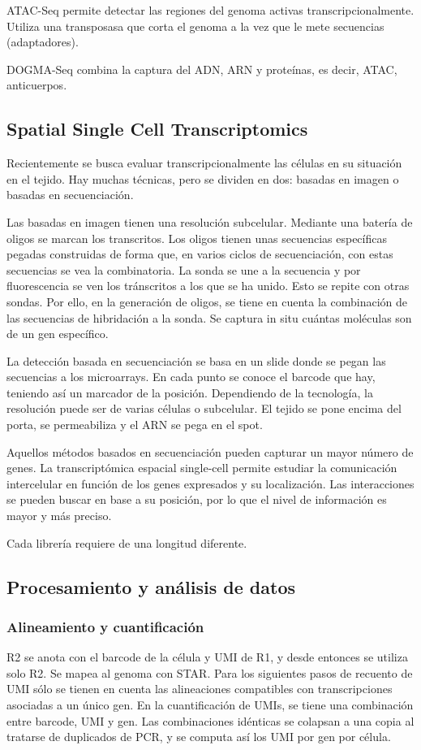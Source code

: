 ATAC-Seq permite detectar las regiones del genoma activas transcripcionalmente. Utiliza una transposasa que corta el genoma a la vez que le mete secuencias (adaptadores). 

DOGMA-Seq combina la captura del ADN, ARN y proteínas, es decir, ATAC, anticuerpos. 

\subsection{Spatial Single Cell Transcriptomics}
Recientemente se busca evaluar transcripcionalmente las células en su situación en el tejido. Hay muchas técnicas, pero se dividen en dos: basadas en imagen o basadas en secuenciación.

Las basadas en imagen tienen una resolución subcelular. Mediante una batería de oligos se marcan los transcritos. Los oligos tienen unas secuencias específicas pegadas construidas de forma que, en varios ciclos de secuenciación, con estas secuencias se vea la combinatoria. La sonda se une a la secuencia y por fluorescencia se ven los tránscritos a los que se ha unido. Esto se repite con otras sondas. Por ello, en la generación de oligos, se tiene en cuenta la combinación de las secuencias de hibridación a la sonda. Se captura in situ cuántas moléculas son de un gen específico. 

La detección basada en secuenciación se basa en un slide donde se pegan las secuencias a los microarrays. En cada punto se conoce el barcode que hay, teniendo así un marcador de la posición. Dependiendo de la tecnología, la resolución puede ser de varias células o subcelular. El tejido se pone encima del porta, se permeabiliza y el ARN se pega en el spot. 

Aquellos métodos basados en secuenciación pueden capturar un mayor número de genes. La transcriptómica espacial single-cell permite estudiar la comunicación intercelular en función de los genes expresados y su localización. Las interacciones se pueden buscar en base a su posición, por lo que el nivel de información es mayor y más preciso. 

Cada librería requiere de una longitud diferente.

\subsection{Procesamiento y análisis de datos}
\subsubsection{Alineamiento y cuantificación}
R2 se anota con el barcode de la célula y UMI de R1, y desde entonces se utiliza solo R2. Se mapea al genoma con STAR. Para los siguientes pasos de recuento de UMI sólo se tienen en cuenta las alineaciones compatibles con transcripciones asociadas a un único gen. En la cuantificación de UMIs, se tiene una combinación entre barcode, UMI y gen. Las combinaciones idénticas se colapsan a una copia al tratarse de duplicados de PCR, y se computa así los UMI por gen por célula.

